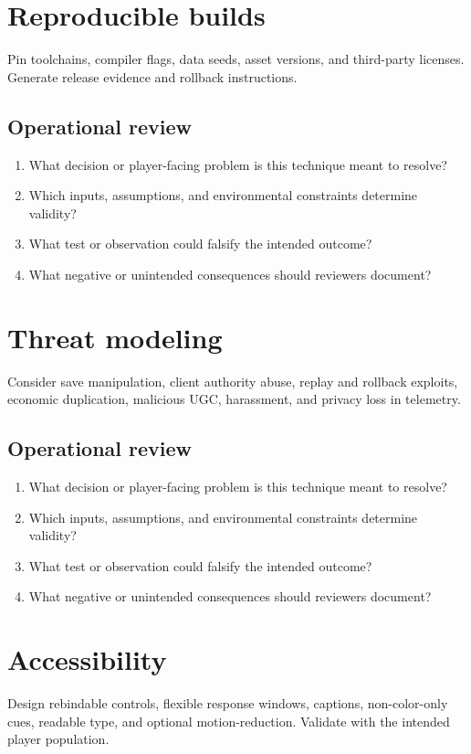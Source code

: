 \documentclass[11pt]{article}
\begin{document}
\section{Reproducible builds}
Pin toolchains, compiler flags, data seeds, asset versions, and third-party licenses. Generate release evidence and rollback instructions.


\subsection{Operational review}
\begin{enumerate}
\item What decision or player-facing problem is this technique meant to resolve?
\item Which inputs, assumptions, and environmental constraints determine validity?
\item What test or observation could falsify the intended outcome?
\item What negative or unintended consequences should reviewers document?
\end{enumerate}

\section{Threat modeling}
Consider save manipulation, client authority abuse, replay and rollback exploits, economic duplication, malicious UGC, harassment, and privacy loss in telemetry.


\subsection{Operational review}
\begin{enumerate}
\item What decision or player-facing problem is this technique meant to resolve?
\item Which inputs, assumptions, and environmental constraints determine validity?
\item What test or observation could falsify the intended outcome?
\item What negative or unintended consequences should reviewers document?
\end{enumerate}

\section{Accessibility}
Design rebindable controls, flexible response windows, captions, non-color-only cues, readable type, and optional motion-reduction. Validate with the intended player population.
\end{document}
